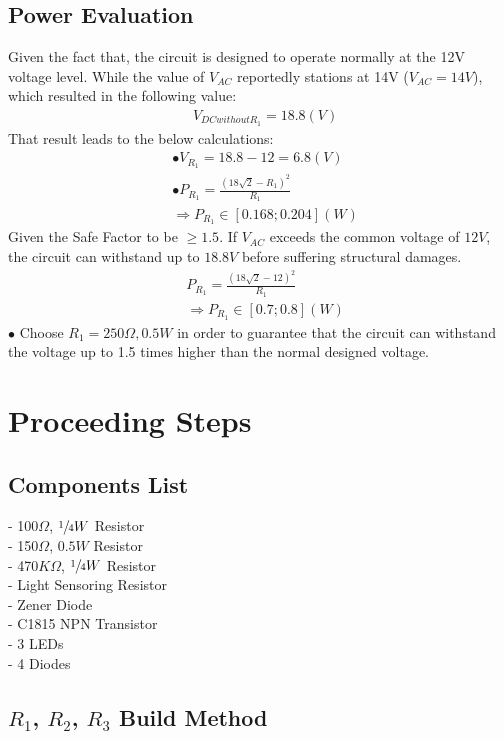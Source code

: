\documentclass[12pt]{extarticle}
\newcommand{\<}{\langle}
\newcommand\tab[1][1cm]{\hspace*{#1}}
\renewcommand{\>}{\rangle}
\theoremstyle{definition}
\begin{document}
\begin{normalsize}
\subsection{Power Evaluation}
Given the fact that, the circuit is designed to operate normally at the 12V voltage level. While the value of $V_{AC}$ reportedly stations at 14V ($V_{AC} = 14V$), which resulted in the following value:
\begin{align*}
&V_{DC without R_1} =  18.8(V)
\end{align*}
That result leads to the below calculations:
\begin{align*}
&\bullet V_{R_1} = 18.8 - 12 = 6.8(V)\\
&\bullet P_{R_1} = \frac{(18\sqrt{2} - R_1)^2}{R_1}\\
&\Longrightarrow P_{R_1} \in [0.168 ; 0.204](W)
\end{align*}
Given the Safe Factor to be $\geq 1.5$. If $V_{AC}$ exceeds the common voltage of $12V$, the circuit can withstand up to $18.8V$ before suffering structural damages.
\begin{align*}
&P_{R_1} = \frac{(18\sqrt{2} - 12)^2}{R_1}\\
&\Longrightarrow P_{R_1} \in [0.7 ; 0.8](W)
\end{align*}
$\bullet$ Choose $R_1 = 250\Omega, 0.5W$ in order to guarantee that the circuit can withstand the voltage up to 1.5 times higher than the normal designed voltage.\\
\clearpage
\section{Proceeding Steps}
\subsection{Components List} 
\tab - 100$\Omega$, $\sfrac{1}{4}W$ Resistor\\
\tab - 150$\Omega$, $0.5W$ Resistor\\
\tab - 470$K\Omega$, $\sfrac{1}{4}W$ Resistor\\
\tab - Light Sensoring Resistor\\
\tab - Zener Diode\\
\tab - C1815 NPN Transistor\\
\tab - 3 LEDs\\
\tab - 4 Diodes
\subsection{$R_1$, $R_2$, $R_3$ Build Method} 


\end{normalsize}
\end{document}
